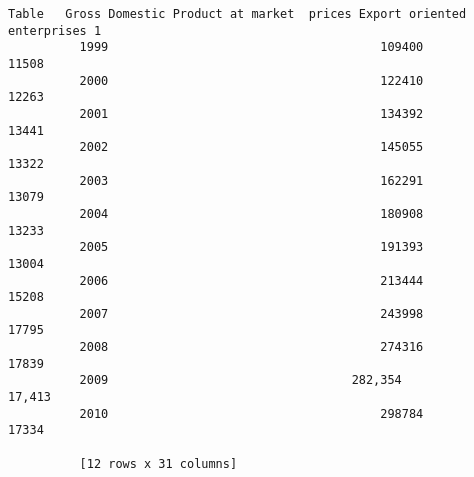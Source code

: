 \documentclass[11pt]{article}
\begin{document}
\begin{Verbatim}[commandchars=\\\{\}]
          Table   Gross Domestic Product at market  prices Export oriented enterprises 1  
          1999                                      109400                         11508  
          2000                                      122410                         12263  
          2001                                      134392                         13441  
          2002                                      145055                         13322  
          2003                                      162291                         13079  
          2004                                      180908                         13233  
          2005                                      191393                         13004  
          2006                                      213444                         15208  
          2007                                      243998                         17795  
          2008                                      274316                         17839  
          2009                                  282,354                        17,413     
          2010                                      298784                         17334  
          
          [12 rows x 31 columns]
\end{Verbatim}
            
\end{document}

